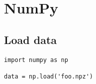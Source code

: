 
\chapter{NumPy}
\label{cha:numpy}

\section{Load data}
\label{sec:load-data}

\begin{lstlisting}
import numpy as np

data = np.load('foo.npz')
\end{lstlisting}



